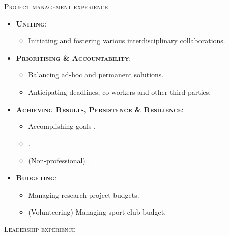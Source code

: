 \documentclass[11pt, a4paper]{article}
\newcommand{\headright}[1]{
    \vspace*{1.5ex}\textsc{\Large\color{cvblue}#1}\par%
    \vspace*{-2ex}{\color{cvblue}\hrulefill}\par
}
\begin{document}
\begin{minipage}[t]{0.9\textwidth}
    \headright{Project management experience}

    \begin{itemize}
        \item \textbf{\textsc{Uniting}}:
        \begin{itemize}
            \item Initiating and fostering various interdisciplinary collaborations.
        \end{itemize}
        \item \textbf{\textsc{Prioritising \& Accountability}}:
        \begin{itemize}
            \item Balancing ad-hoc and permanent solutions.
            \item Anticipating deadlines, co-workers and other third parties.
        \end{itemize}
        \item \textbf{\textsc{Achieving Results, Persistence \& Resilience}}:
        \begin{itemize}
            \item Accomplishing goals .
            \item {}.
            \item (Non-professional) .
        \end{itemize}
        \item \textbf{\textsc{Budgeting}}:
        \begin{itemize}
            \item Managing research project budgets.
            \item (Volunteering) Managing sport club budget.
        \end{itemize}
    \end{itemize}

    \headright{Leadership experience}


\end{minipage}
\end{document}
